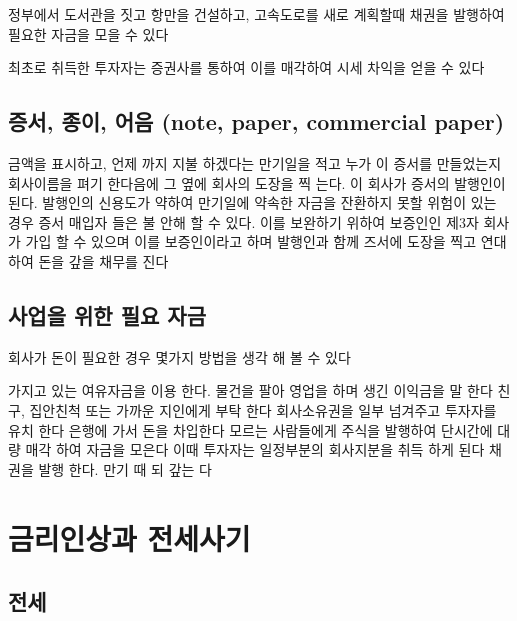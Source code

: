 \documentclass[
]{book}
\begin{document}
정부에서 도서관을 짓고 항만을 건설하고, 고속도로를 새로 계획할때 채권을 발행하여 필요한 자금을 모을 수 있다

최초로 취득한 투자자는 증권사를 통하여 이를 매각하여 시세 차익을 얻을 수 있다

\hypertarget{uxc99duxc11c-uxc885uxc774-uxc5b4uxc74c-note-paper-commercial-paper}{%
\section{증서, 종이, 어음 (note, paper, commercial paper)}\label{uxc99duxc11c-uxc885uxc774-uxc5b4uxc74c-note-paper-commercial-paper}}

금액을 표시하고, 언제 까지 지불 하겠다는 만기일을 적고 누가 이 증서를 만들었는지 회사이름을 펴기 한다음에 그 옆에 회사의 도장을 찍 는다. 이 회사가 증서의 발행인이 된다. 발행인의 신용도가 약하여 만기일에 약속한 자금을 잔환하지 못할 위험이 있는 경우 증서 매입자 들은 불 안해 할 수 있다. 이를 보완하기 위하여 보증인인 제3자 회사가 가입 할 수 있으며 이를 보증인이라고 하며 발행인과 함께 즈서에 도장을 찍고 연대하여 돈을 갚을 채무를 진다

\hypertarget{uxc0acuxc5c5uxc744-uxc704uxd55c-uxd544uxc694-uxc790uxae08}{%
\section{사업을 위한 필요 자금}\label{uxc0acuxc5c5uxc744-uxc704uxd55c-uxd544uxc694-uxc790uxae08}}

회사가 돈이 필요한 경우 몇가지 방법을 생각 해 볼 수 있다

가지고 있는 여유자금을 이용 한다. 물건을 팔아 영업을 하며 생긴 이익금을 말 한다
친구, 집안친척 또는 가까운 지인에게 부탁 한다
회사소유권을 일부 넘겨주고 투자자를 유치 한다
은행에 가서 돈을 차입한다
모르는 사람들에게 주식을 발행하여 단시간에 대량 매각 하여 자금을 모은다 이때 투자자는 일정부분의 회사지분을 취득 하게 된다
채권을 발행 한다. 만기 때 되 갚는 다

\hypertarget{uxae08uxb9acuxc778uxc0c1uxacfc-uxc804uxc138uxc0acuxae30}{%
\chapter{금리인상과 전세사기}\label{uxae08uxb9acuxc778uxc0c1uxacfc-uxc804uxc138uxc0acuxae30}}

\hypertarget{uxc804uxc138}{%
\section{전세}\label{uxc804uxc138}}
\end{document}
